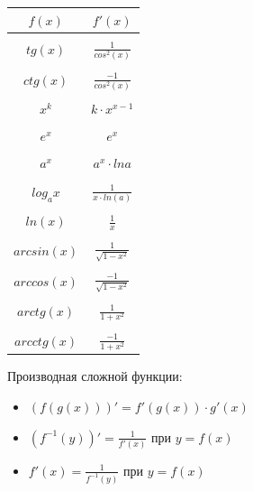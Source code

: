 \documentclass[oneside]{book}
\begin{document}
  \begin{center}
      \begin{tabular}{c|c}
        $f(x)$ & $f'(x)$ \\
        \hline \\
        $tg(x)$ & $\frac{1}{cos^2(x)}$ \\
          \hline \\
        $ctg(x)$ & $\frac{-1}{cos^2(x)}$ \\
          \hline \\
        $x^k$ & $k \cdot x^{x-1}$ \\
          \hline \\
        $e^x$ & $e^x$ \\
          \hline \\
       $a^x$ & $a^x \cdot ln a$ \\
          \hline \\ 
	 $log_a x$ & $\frac{1}{x \cdot ln(a)}$ \\
          \hline \\
        $ln(x)$ & $\frac{1}{x}$ \\
          \hline \\
        $arcsin(x)$ & $\frac{1}{\sqrt{1 - x^2}}$ \\
          \hline \\
        $arccos(x)$ & $\frac{-1}{\sqrt{1 - x^2}}$ \\
          \hline \\
        $arctg(x)$ & $\frac{1}{1 + x^2}$ \\
          \hline \\
        $arcctg(x)$ & $\frac{-1}{1 + x^2}$ \\
      \end{tabular}
  \end{center}
Производная сложной функции:
\begin{itemize}
  \item $(f(g(x)))' = f'(g(x)) \cdot g'(x)$
  \item $(f^{-1}(y))' = \frac{1}{f'(x)}$ при $y = f(x)$
  \item $f'(x) = \frac{1}{f^{-1}(y)}$ при $y = f(x)$
\end{itemize}

\setcounter{chapter}{17}
\end{document}
